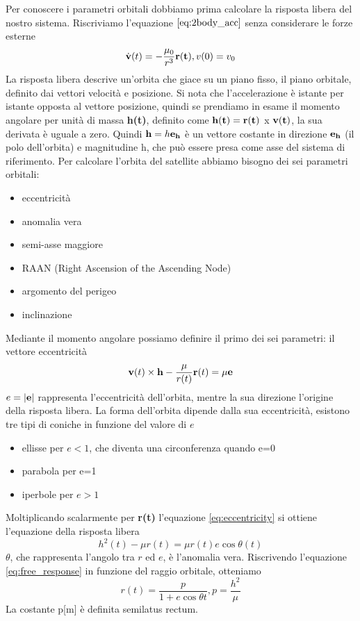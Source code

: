 Per conoscere i parametri orbitali dobbiamo prima calcolare la risposta libera
del nostro sistema. Riscriviamo l'equazione $\ref{eq:2body_acc}$ senza
considerare le forze esterne
\begin{equation}
\dot{\bf v}(t)=-\frac{\mu_0}{r^3}{\bf r(t)}, v(0)=v_0
\label{eq:free_response}
\end{equation}
La risposta libera descrive un'orbita che giace su un piano fisso, il piano
orbitale, definito dai vettori velocità e posizione. Si nota che l'accelerazione
è istante per istante opposta al vettore posizione, quindi se prendiamo in esame
il momento angolare per unità di massa {\bf h(t)}, definito come ${\bf
h(t)}={\bf r(t)}$ x ${\bf v(t)}$, la sua derivata è uguale a zero. Quindi ${\bf
h}=h{\bf e_h}$ è un vettore costante in direzione ${\bf e_h}$ (il polo dell'orbita) e
magnitudine h, che può essere presa come asse del sistema di riferimento.
Per calcolare l'orbita del satellite abbiamo bisogno dei sei parametri orbitali:
\begin{itemize}
  \item eccentricità
  \item anomalia vera
  \item semi-asse maggiore
  \item RAAN (Right Ascension of the Ascending Node)
  \item argomento del perigeo
  \item inclinazione
\end{itemize}
Mediante il momento angolare possiamo definire il primo dei sei
parametri: il vettore eccentricità
\begin{equation}
{\bf v}(t) \times {\bf h} - \frac{\mu}{r(t)}{\bf r}(t)=\mu{\bf e}
\label{eq:eccentricity}
\end{equation}
$e=|{\bf e}|$ rappresenta  l'eccentricità dell'orbita, mentre la sua direzione
l'origine della risposta libera. La forma dell'orbita dipende dalla sua
eccentricità, esistono tre tipi di coniche in funzione del valore di $e$
\begin{itemize}
  \item ellisse per $e<1$, che diventa una circonferenza quando e=0
  \item parabola per e=1 
  \item iperbole per $e>1$
\end{itemize}
Moltiplicando scalarmente per {\bf r(t)} l'equazione \ref{eq:eccentricity} si ottiene l'equazione
della risposta libera
\begin{equation}
h^2(t)-\mu r(t)=\mu r(t)e \cos{\theta(t)}
\label{eq:free_response}
\end{equation}
$\theta$, che rappresenta l'angolo tra $r$ ed $e$, è l'anomalia vera.
Riscrivendo l'equazione \ref{eq:free_response} in funzione del raggio orbitale,
otteniamo
\begin{equation}
r(t)=\frac{p}{1+e\cos{\theta{t}}} , p=\frac{h^2}{\mu}
\end{equation}
La costante p[m] è definita semilatus rectum.

